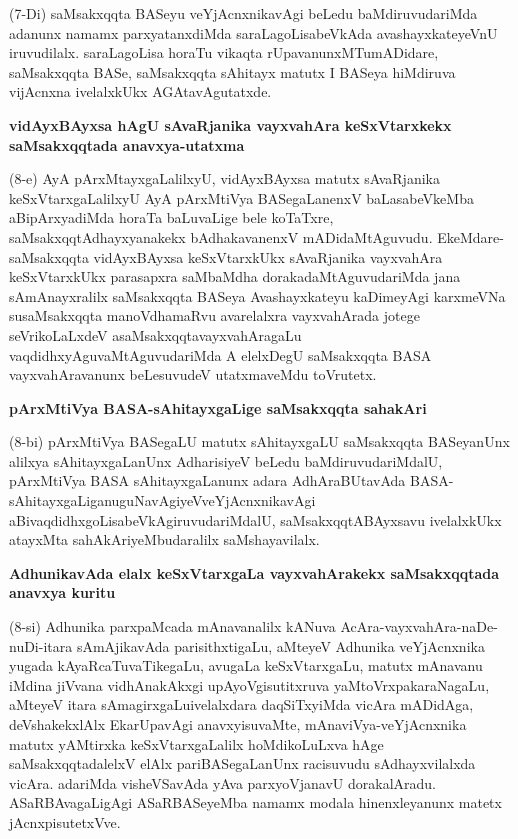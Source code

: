 (7-Di) saMsakxqqta BASeyu veYjAcnxnikavAgi beLedu baMdiruvudariMda adanunx namamx parxyatanxdiMda saraLagoLisabeVkAda avashayxkateyeVnU  iruvudilalx. saraLagoLisa horaTu vikaqta rUpavanunxMTumADi\-dare, saMsakxqqta BASe, saMsakxqqta sAhitayx matutx I BASeya hiMdiruva vijAcnxna ivelalxkUkx AGAtavAgutatxde.

{\medskip
\noindent
{\large\bf vidAyxBAyxsa hAgU sAvaRjanika vayxvahAra keSxVtarxkekx saMsakxqqtada anavxya-\break\-utatxma}}\label{page36}
\smallskip

\noindent
(8-e) AyA pArxMtayxgaLalilxyU, vidAyxBAyxsa matutx sAvaRjanika keSxVtarxgaLalilxyU AyA pArxM\-tiVya BASegaLanenxV baLasabeVkeMba aBipArxyadiMda horaTa baLuvaLige bele koTaTxre, saMsakxqqtAdhayxya\-nakekx bAdhaka\-vanenxV mADidaMtAguvudu. EkeMdare-saMsakxqqta vidAyxBAyxsa keSxVtarxkUkx sAvaRjanika vayxva\-hAra keSxVtarxkUkx parasapxra saMbaMdha dorakadaMtAguvudariMda jana sAmAnayxralilx saMsakxqqta BASeya Avashayx\-kateyu kaDime\-yAgi karxmeVNa susaMsakxqqta manoVdhamaRvu avarelalxra vayxvahArada jotege seVrikoLaLxdeV asaM\-sakxqqta\-vayxvahAragaLu vaqdidhxyAguvaMtAguvudariMda A elelxDegU saMsakxqqta BASA vayxvahAravanunx beLesu\-vudeV utatxmaveMdu toVrutetx.

{\bigskip
\noindent
{\large\bf pArxMtiVya BASA-sAhitayxgaLige saMsakxqqta sahakAri}}\label{page36a}
\medskip

\noindent
(8-bi) pArxMtiVya BASegaLU matutx sAhitayxgaLU saMsakxqqta BASeyanUnx alilxya sAhitayx\-gaLanUnx Adha\-risiyeV beLedu baMdiruvudariMdalU, pArxMtiVya BASA sAhitayxgaLanunx adara AdhAraBUta\-vAda BASA-sAhitayxgaLiganuguNavAgiyeV\break veYjAcnx\-nikavAgi aBivaqdidhxgoLisabeVkAgiruvuda\-riMdalU, saMsakxqqtA\-BAyxsavu ivelalxkUkx atayxMta sahAkAriyeMbudaralilx saMshayavilalx.

{\bigskip
\noindent
{\large\bf AdhunikavAda elalx keSxVtarxgaLa vayxvahArakekx saMsakxqqtada anavxya kuritu}}\label{page36b}
\medskip

\noindent
(8-si) Adhunika parxpaMcada mAnavanalilx kANuva AcAra-vayxvahAra-naDe-nuDi-\-itara sAmAjika\-vAda parisithxtigaLu, aMteyeV Adhunika veYjAcnxnika yugada kAyaR\-caTuvaTikegaLu, avugaLa keSxVtarxgaLu, matutx mAnavanu iMdina jiVvana vidhAnakAkxgi upAyoVgisutitxruva yaMtoVrxpakaraNagaLu, aMteyeV itara sAmagirxgaLu\break ivelalxdara daqSiTxyiMda vicAra mADidAga, deVshakekxlAlx EkarUpavAgi anavxyisu\-vaMte, mAna\-viVya-veYjAcnxnika matutx yAMtirxka keSxVtarxgaLalilx hoMdikoLuLxva hAge saMsakxqqtadalelxV elAlx pariBASe\-gaLanUnx racisuvudu sAdhayxvilalxda vicAra. adariMda visheVSavAda yAva parxyoVjanavU dorakalAradu. ASaR\-BAvagaLigAgi ASaR\-BASeyeMba namamx modala hinenxleyanunx matetx jAcnxpisutetxVve.

